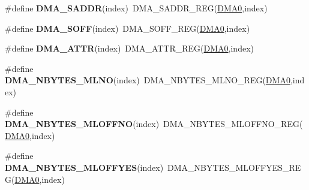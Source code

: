 \begin{DoxyCompactItemize}
\item 
\#define {\bfseries D\+M\+A\+\_\+\+S\+A\+D\+DR}(index)~D\+M\+A\+\_\+\+S\+A\+D\+D\+R\+\_\+\+R\+EG(\hyperlink{group__DMA__Peripheral__Access__Layer_ga4103044f9ca209772f513dc694513ffb}{D\+M\+A0},index)\hypertarget{group__DMA__Register__Accessor__Macros_gac79de6ef4790e670b262d808b0851c33}{}\label{group__DMA__Register__Accessor__Macros_gac79de6ef4790e670b262d808b0851c33}

\item 
\#define {\bfseries D\+M\+A\+\_\+\+S\+O\+FF}(index)~D\+M\+A\+\_\+\+S\+O\+F\+F\+\_\+\+R\+EG(\hyperlink{group__DMA__Peripheral__Access__Layer_ga4103044f9ca209772f513dc694513ffb}{D\+M\+A0},index)\hypertarget{group__DMA__Register__Accessor__Macros_gaf550e7107851b8d89ba562c92147a7d8}{}\label{group__DMA__Register__Accessor__Macros_gaf550e7107851b8d89ba562c92147a7d8}

\item 
\#define {\bfseries D\+M\+A\+\_\+\+A\+T\+TR}(index)~D\+M\+A\+\_\+\+A\+T\+T\+R\+\_\+\+R\+EG(\hyperlink{group__DMA__Peripheral__Access__Layer_ga4103044f9ca209772f513dc694513ffb}{D\+M\+A0},index)\hypertarget{group__DMA__Register__Accessor__Macros_ga9f4a8700fcf390a0c91df4a5698550ba}{}\label{group__DMA__Register__Accessor__Macros_ga9f4a8700fcf390a0c91df4a5698550ba}

\item 
\#define {\bfseries D\+M\+A\+\_\+\+N\+B\+Y\+T\+E\+S\+\_\+\+M\+L\+NO}(index)~D\+M\+A\+\_\+\+N\+B\+Y\+T\+E\+S\+\_\+\+M\+L\+N\+O\+\_\+\+R\+EG(\hyperlink{group__DMA__Peripheral__Access__Layer_ga4103044f9ca209772f513dc694513ffb}{D\+M\+A0},index)\hypertarget{group__DMA__Register__Accessor__Macros_gad7691b3856b237a914bf0f8c7cd28804}{}\label{group__DMA__Register__Accessor__Macros_gad7691b3856b237a914bf0f8c7cd28804}

\item 
\#define {\bfseries D\+M\+A\+\_\+\+N\+B\+Y\+T\+E\+S\+\_\+\+M\+L\+O\+F\+F\+NO}(index)~D\+M\+A\+\_\+\+N\+B\+Y\+T\+E\+S\+\_\+\+M\+L\+O\+F\+F\+N\+O\+\_\+\+R\+EG(\hyperlink{group__DMA__Peripheral__Access__Layer_ga4103044f9ca209772f513dc694513ffb}{D\+M\+A0},index)\hypertarget{group__DMA__Register__Accessor__Macros_ga47a6deae65a6ba78099a77b1d700b0a4}{}\label{group__DMA__Register__Accessor__Macros_ga47a6deae65a6ba78099a77b1d700b0a4}

\item 
\#define {\bfseries D\+M\+A\+\_\+\+N\+B\+Y\+T\+E\+S\+\_\+\+M\+L\+O\+F\+F\+Y\+ES}(index)~D\+M\+A\+\_\+\+N\+B\+Y\+T\+E\+S\+\_\+\+M\+L\+O\+F\+F\+Y\+E\+S\+\_\+\+R\+EG(\hyperlink{group__DMA__Peripheral__Access__Layer_ga4103044f9ca209772f513dc694513ffb}{D\+M\+A0},index)\hypertarget{group__DMA__Register__Accessor__Macros_ga2b5c965156acab64292450aab3e4e813}{}\label{group__DMA__Register__Accessor__Macros_ga2b5c965156acab64292450aab3e4e813}


\end{DoxyCompactItemize}
